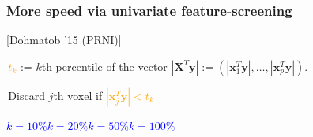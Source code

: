 \documentclass{beamer}
\def\mydot{\structure{\rule{1ex}{1ex}}\,}
\def\B#1{\mathbf{#1}}
\def\emph#1{\textbf{\textcolor{orange}{#1}}}
\newcommand{\mycite}[1]{\textcolor{myblue}{[#1]}}
\begin{document}
\begin{frame}\frametitle{More speed via univariate feature-screening}
  \vspace{-.7em}
  \mycite{Dohmatob '15 (PRNI)}
  \medskip
  
  \mydot \emph{$t_k$} := $k$th percentile of the vector $|\B{X}^T\B{y}| := (|\B{x}_1^T\B{y}|,\ldots,|\B{x}_p^T\B{y}|)$.
  
  \mydot Discard $j$th voxel if \emph{$|\B{x}^T_j\B{y}| < t_k$}
  \bigskip
  
  \quad\textcolor{blue}{$k = 10\%$}\quad\quad\quad\;\textcolor{blue}{$k = 20\%$}\quad\quad\quad\textcolor{blue}{$k = 50\%$}\quad\quad\quad\textcolor{blue}{$k = 100\%$}
  \begin{overlayarea}{\textwidth}{\textheight}

  \end{overlayarea}


\end{frame}
\end{document}
